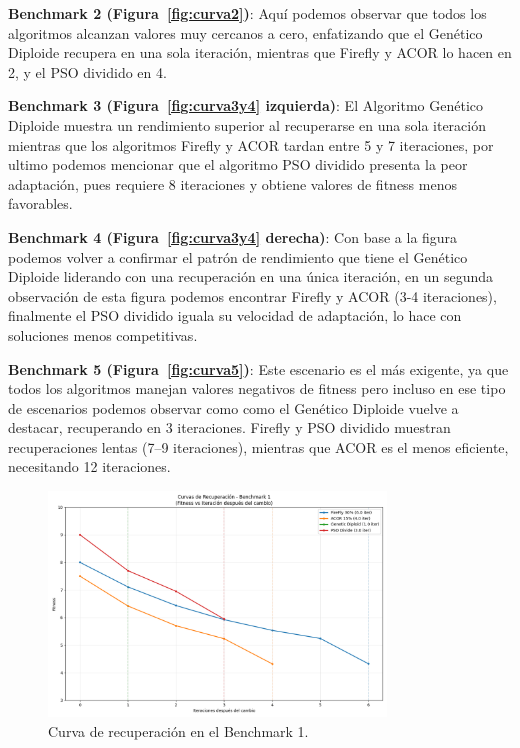 \documentclass[10pt]{article}
\begin{document}
\textbf{Benchmark 2 (Figura~\ref{fig:curva2})}: Aquí podemos observar que todos los algoritmos alcanzan valores muy cercanos a cero, enfatizando que el Genético Diploide recupera en una sola iteración, mientras que Firefly y ACOR lo hacen en 2, y el PSO dividido en 4. 

\textbf{Benchmark 3 (Figura~\ref{fig:curva3y4} izquierda)}: El Algoritmo Genético Diploide muestra un rendimiento superior al recuperarse en una sola iteración mientras que los algoritmos Firefly y ACOR tardan entre 5 y 7 iteraciones, por ultimo podemos mencionar que el algoritmo PSO dividido presenta la peor adaptación, pues requiere 8 iteraciones y obtiene valores de fitness menos favorables.

\textbf{Benchmark 4 (Figura~\ref{fig:curva3y4} derecha)}: Con base a la figura podemos volver a confirmar el patrón de rendimiento que tiene el Genético Diploide liderando con una recuperación en una única iteración, en un segunda observación de esta figura podemos encontrar Firefly y ACOR (3-4 iteraciones), finalmente el PSO dividido iguala su velocidad de adaptación, lo hace con soluciones menos competitivas.

\textbf{Benchmark 5 (Figura~\ref{fig:curva5})}: Este escenario es el más exigente, ya que todos los algoritmos manejan valores negativos de fitness pero incluso en ese tipo de escenarios podemos observar como como el Genético Diploide vuelve a destacar, recuperando en 3 iteraciones. Firefly y PSO dividido muestran recuperaciones lentas (7–9 iteraciones), mientras que ACOR es el menos eficiente, necesitando 12 iteraciones.

\begin{figure}[H]
    \centering
    \includegraphics[width=0.8\textwidth]{imagenes/curva1.png}
    \caption{Curva de recuperación en el Benchmark 1.}
    \label{fig:curva1}
\end{figure}
\end{document}
